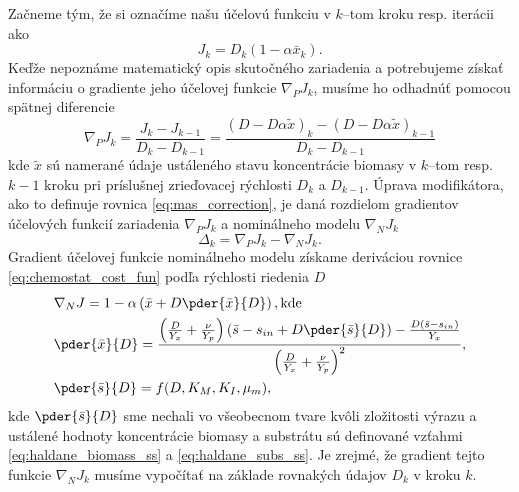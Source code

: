 Začneme tým, že si označíme našu účelovú funkciu v $ k $--tom kroku resp. iterácii ako
\begin{equation}
	\label{eq:chemostat_cost_fun}
	J_{k} = D_{k}\left(1-\alpha\bar{x}_{k}\right).
\end{equation}
Keďže nepoznáme matematický opis skutočného zariadenia a potrebujeme získať informáciu o gradiente jeho účelovej funkcie $ \nabla_{P}J_{k} $, musíme ho odhadnúť pomocou spätnej diferencie
\begin{equation}
	\nabla_{P}J_{k} = \frac{J_{k} - J_{k-1}}{D_{k} - D_{k-1}} = \frac{\left(D-D\alpha\tilde{x}\right)_{k} - \left(D-D\alpha\tilde{x}\right)_{k-1}}{D_{k} - D_{k-1}}
\end{equation}
kde $ \tilde{x} $ sú namerané údaje ustáleného stavu koncentrácie biomasy v $ k $--tom resp. $ k-1 $ kroku pri príslušnej zrieďovacej rýchlosti $ D_{k} $ a $ D_{k-1} $. Úprava modifikátora, ako to definuje rovnica \eqref{eq:mas_correction}, je daná rozdielom gradientov účelových funkcií zariadenia $ \nabla_{P}J_{k} $ a nominálneho modelu $ \nabla_{N}J_{k} $ 
\begin{equation}
	\Delta_k = \nabla_{P}J_{k} - \nabla_{N}J_{k}.
\end{equation}
Gradient účelovej funkcie nominálneho modelu získame deriváciou rovnice \eqref{eq:chemostat_cost_fun} podľa rýchlosti riedenia $ D $
\begin{align}
	&\nabla_{N}J = 1 - \alpha\left(\bar{x}+D\pder{\bar{x}}{D}\right), \text{kde}\\
	&\pder{\bar{x}}{D} = \frac{\left(\frac{D}{Y_{x}} + \frac{\nu}{Y_{p}}\right)\left(\bar{s}-s_{in}+D\pder{\bar{s}}{D}\right) - \frac{D\left(\bar{s}-s_{in}\right)}{Y_{x}}}{\left(\frac{D}{Y_{x}} + \frac{\nu}{Y_{p}}\right)^2},	\\
	&\pder{\bar{s}}{D} = f(D,K_{M},K_{I},\mu_{m}),
\end{align}
kde $ \pder{\bar{s}}{D} $ sme nechali vo všeobecnom tvare kvôli zložitosti výrazu a ustálené hodnoty koncentrácie biomasy a substrátu sú definované vzťahmi \eqref{eq:haldane_biomass_ss} a \eqref{eq:haldane_subs_ss}. Je zrejmé, že gradient tejto funkcie $ \nabla_{N}J_{k} $ musíme vypočítať na základe rovnakých údajov $ D_k $ v kroku $ k $.

